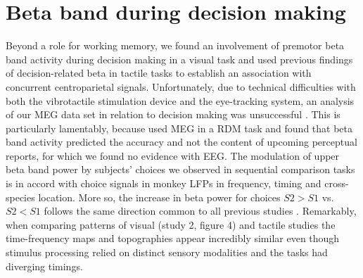 \section{Beta band during decision making}
Beyond a role for working memory, we found an involvement of premotor beta band activity during decision making in a visual task and used previous findings of decision-related beta in tactile tasks to establish an association with concurrent centroparietal signals. Unfortunately, due to technical difficulties with both the vibrotactile stimulation device and the eye-tracking system, an analysis of our MEG data set in relation to decision making was unsuccessful \parencite[cf.][]{Chandler2015}. This is particularly lamentably, because \textcite{Donner2007} used MEG in a RDM task and found that beta band activity predicted the accuracy and not the content of upcoming perceptual reports, for which we found no evidence with EEG. 
The modulation of upper beta band power by subjects’ choices we observed in sequential comparison tasks is in accord with choice signals in monkey LFPs \parencite{Haegens2011} in frequency, timing and cross-species location. More so, the increase in beta power for choices $S2>S1$ vs. $S2<S1$ follows the same direction common to all previous studies \parencite{Haegens2011,Herding2016,Herding2017,Ludwig2018}. Remarkably, when comparing patterns of visual (study 2, figure 4) and tactile studies \parencite[][figure4]{Herding2016} the time-frequency maps and topographies appear incredibly similar even though stimulus processing relied on distinct sensory modalities and the tasks had diverging timings. 

